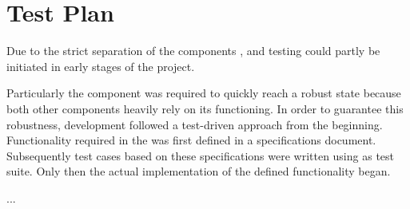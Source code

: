 \section{Test Plan}\label{sec:test_plan}

Due to the strict separation of the components \be, \ph and \ter testing could partly be initiated in early stages of the project.

Particularly the \be component was required to quickly reach a robust state because both other components heavily rely on its functioning.
In order to guarantee this robustness, development followed a test-driven approach from the beginning.
Functionality required in the \be was first defined in a specifications document.
Subsequently test cases based on these specifications were written using \vows as test suite.
Only then the actual implementation of the defined functionality began.

...
